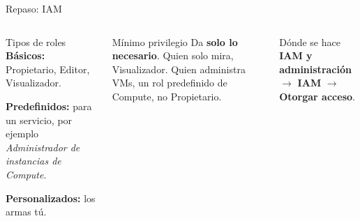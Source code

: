 \documentclass[aspectratio=169,10pt,c]{beamer}
\begin{document}
\begin{frame}{Repaso: IAM}
\begin{center}
\end{center}
\begin{columns}[T,onlytextwidth]
\begin{exampleblock}{Tipos de roles}
\small
\textbf{Básicos:} Propietario, Editor, Visualizador.\par\smallskip
\textbf{Predefinidos:} para un servicio, por ejemplo \emph{Administrador de instancias de Compute}.\par\smallskip
\textbf{Personalizados:} los armas tú.
\end{exampleblock}
\begin{block}{Mínimo privilegio}
\small Da \textbf{solo lo necesario}. Quien solo mira, Visualizador. Quien administra VMs, un rol predefinido de Compute, no Propietario.
\end{block}
\begin{alertblock}{Dónde se hace}
\small \textbf{IAM y administración} $\rightarrow$ \textbf{IAM} $\rightarrow$ \textbf{Otorgar acceso}.
\end{alertblock}
\end{columns}
\end{frame}
\end{document}
